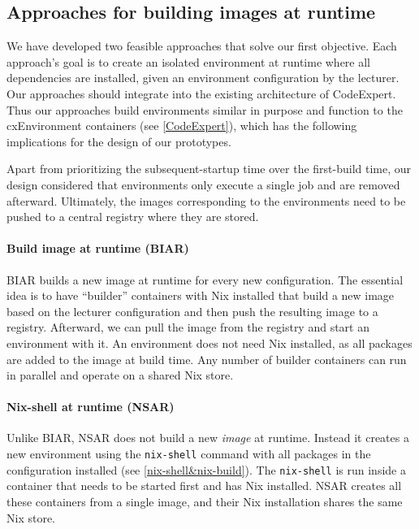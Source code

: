 \subsection{Approaches for building images at runtime}\label{methodology:approaches-prototypes}
We have developed two feasible approaches that solve our first objective. Each approach's goal is to create an isolated environment at runtime where all dependencies are installed, given an environment configuration by the lecturer. Our approaches should integrate into the existing architecture of CodeExpert. Thus our approaches build environments similar in purpose and function to the cxEnvironment containers (see \ref{CodeExpert}), which has the following implications for the design of our prototypes.

Apart from prioritizing the subsequent-startup time over the first-build time, our design considered that environments only execute a single job and are removed afterward. Ultimately, the images corresponding to the environments need to be pushed to a central registry where they are stored.

\paragraph{Build image at runtime (BIAR)}
BIAR builds a new image at runtime for every new configuration. The essential idea is to have ``builder'' containers with Nix installed that build a new image based on the lecturer configuration and then push the resulting image to a registry. Afterward, we can pull the image from the registry and start an environment with it. An environment does not need Nix installed, as all packages are added to the image at build time. Any number of builder containers can run in parallel and operate on a shared Nix store. 
\paragraph{Nix-shell at runtime (NSAR)}
Unlike BIAR, NSAR does not build a new \emph{image} at runtime. Instead it creates a new environment using the \verb|nix-shell| command with all packages in the configuration installed (see \ref{nix-shell&nix-build}). The \verb|nix-shell| is run inside a container that needs to be started first and has Nix installed. NSAR creates all these containers from a single image, and their Nix installation shares the same Nix store.
